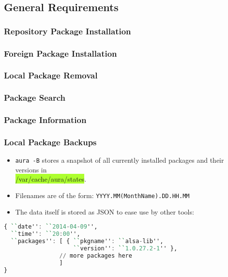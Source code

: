 \documentclass{article}
\begin{document}
\subsection{General Requirements}
\subsubsection{Repository Package Installation}
\subsubsection{Foreign Package Installation}
\subsubsection{Local Package Removal}
\subsubsection{Package Search}
\subsubsection{Package Information}

\subsubsection{Local Package Backups}
\begin{itemize}
\itemsep1pt\parskip0pt
\item
  \texttt{aura -B} stores a snapshot of all currently installed packages
  and their versions in\\ \colorbox{GreenYellow}{/var/cache/aura/states}.
\item
  Filenames are of the form: \texttt{YYYY.MM(MonthName).DD.HH.MM}
\item
  The data itself is stored as JSON to ease use by other tools:
\end{itemize}

\begin{shaded}
\begin{lstlisting}[language=haskell]
{ ``date'': ``2014-04-09'',
  ``time'': ``20:00'',
  ``packages'': [ { ``pkgname'': ``alsa-lib'',
                    ``version'': ``1.0.27.2-1'' },
                // more packages here
                ]
}
\end{lstlisting}
\end{shaded}
\end{document}
